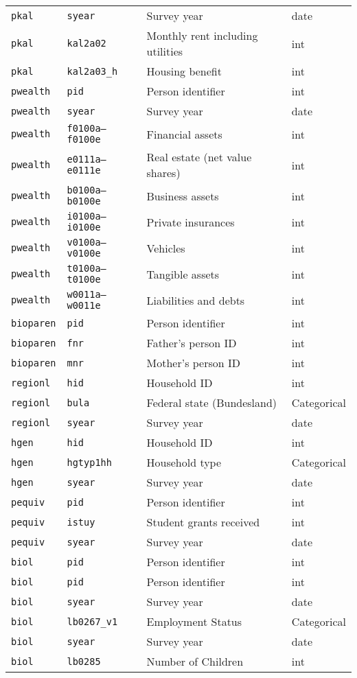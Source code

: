 {\begin{longtable}{llll}
\texttt{pkal} & \texttt{syear} & Survey year & date \\
\texttt{pkal} & \texttt{kal2a02} & Monthly rent including utilities & int \\
\texttt{pkal} & \texttt{kal2a03\_h} & Housing benefit & int \\
\texttt{pwealth} & \texttt{pid} & Person identifier & int \\
\texttt{pwealth} & \texttt{syear} & Survey year & date \\
\texttt{pwealth} & \texttt{f0100a--f0100e} & Financial assets & int \\
\texttt{pwealth} & \texttt{e0111a--e0111e} & Real estate (net value shares) & int \\
\texttt{pwealth} & \texttt{b0100a--b0100e} & Business assets & int \\
\texttt{pwealth} & \texttt{i0100a--i0100e} & Private insurances & int \\
\texttt{pwealth} & \texttt{v0100a--v0100e} & Vehicles & int \\
\texttt{pwealth} & \texttt{t0100a--t0100e} & Tangible assets & int \\
\texttt{pwealth} & \texttt{w0011a--w0011e} & Liabilities and debts & int \\
\texttt{bioparen} & \texttt{pid} & Person identifier & int \\
\texttt{bioparen} & \texttt{fnr} & Father’s person ID & int \\
\texttt{bioparen} & \texttt{mnr} & Mother’s person ID & int \\
\texttt{regionl} & \texttt{hid} & Household ID & int \\
\texttt{regionl} & \texttt{bula} & Federal state (Bundesland) & Categorical \\
\texttt{regionl} & \texttt{syear} & Survey year & date \\
\texttt{hgen} & \texttt{hid} & Household ID & int \\
\texttt{hgen} & \texttt{hgtyp1hh} & Household type & Categorical \\
\texttt{hgen} & \texttt{syear} & Survey year & date \\
\texttt{pequiv} & \texttt{pid} & Person identifier & int \\
\texttt{pequiv} & \texttt{istuy} & Student grants received & int \\
\texttt{pequiv} & \texttt{syear} & Survey year & date \\
\texttt{biol} & \texttt{pid} & Person identifier & int \\
\texttt{biol} & \texttt{pid} & Person identifier & int \\
\texttt{biol} & \texttt{syear} & Survey year & date \\
\texttt{biol} & \texttt{lb0267\_v1} & Employment Status & Categorical \\
\texttt{biol} & \texttt{syear} & Survey year & date \\
\texttt{biol} & \texttt{lb0285} & Number of Children & int \\
\end{longtable}
}
